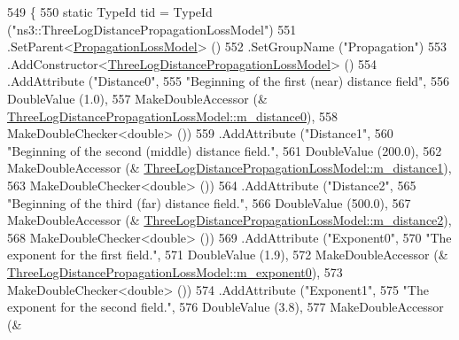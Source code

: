 \begin{DoxyCode}
549 \{
550   \textcolor{keyword}{static} TypeId tid = TypeId (\textcolor{stringliteral}{"ns3::ThreeLogDistancePropagationLossModel"})
551     .SetParent<\hyperlink{classns3_1_1PropagationLossModel_ace8b78c2c8e805cd0a919d7e3543318c}{PropagationLossModel}> ()
552     .SetGroupName (\textcolor{stringliteral}{"Propagation"})
553     .AddConstructor<\hyperlink{classns3_1_1ThreeLogDistancePropagationLossModel_a87c77346b3e44d1b38888c2b10fa3eaf}{ThreeLogDistancePropagationLossModel}> ()
554     .AddAttribute (\textcolor{stringliteral}{"Distance0"},
555                    \textcolor{stringliteral}{"Beginning of the first (near) distance field"},
556                    DoubleValue (1.0),
557                    MakeDoubleAccessor (&
      \hyperlink{classns3_1_1ThreeLogDistancePropagationLossModel_a47d290dc3c7638585677fc3611155997}{ThreeLogDistancePropagationLossModel::m\_distance0}),
558                    MakeDoubleChecker<double> ())
559     .AddAttribute (\textcolor{stringliteral}{"Distance1"},
560                    \textcolor{stringliteral}{"Beginning of the second (middle) distance field."},
561                    DoubleValue (200.0),
562                    MakeDoubleAccessor (&
      \hyperlink{classns3_1_1ThreeLogDistancePropagationLossModel_a7d3860fbf9e870e531347f5dbde5e586}{ThreeLogDistancePropagationLossModel::m\_distance1}),
563                    MakeDoubleChecker<double> ())
564     .AddAttribute (\textcolor{stringliteral}{"Distance2"},
565                    \textcolor{stringliteral}{"Beginning of the third (far) distance field."},
566                    DoubleValue (500.0),
567                    MakeDoubleAccessor (&
      \hyperlink{classns3_1_1ThreeLogDistancePropagationLossModel_a499aeeef32ff37d5f64f774abaf6e2a9}{ThreeLogDistancePropagationLossModel::m\_distance2}),
568                    MakeDoubleChecker<double> ())
569     .AddAttribute (\textcolor{stringliteral}{"Exponent0"},
570                    \textcolor{stringliteral}{"The exponent for the first field."},
571                    DoubleValue (1.9),
572                    MakeDoubleAccessor (&
      \hyperlink{classns3_1_1ThreeLogDistancePropagationLossModel_a938d5a86f74faae0e032676e4a8a3233}{ThreeLogDistancePropagationLossModel::m\_exponent0}),
573                    MakeDoubleChecker<double> ())
574     .AddAttribute (\textcolor{stringliteral}{"Exponent1"},
575                    \textcolor{stringliteral}{"The exponent for the second field."},
576                    DoubleValue (3.8),
577                    MakeDoubleAccessor (&

\end{DoxyCode}
